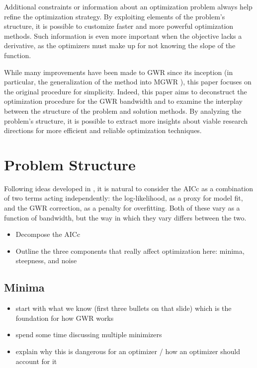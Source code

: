 \documentclass[letterpaper,12pt,twocolumn]{article}
\begin{document}
Additional constraints or information about an optimization problem always help refine the optimization strategy. By exploiting elements of the problem's structure, it is possible to customize faster and more powerful optimization methods. Such information is even more important when the objective lacks a derivative, as the optimizers must make up for not knowing the slope of the function.

While many improvements have been made to GWR since its inception (in particular, the generalization of the method into MGWR \cite{Oshan2019}), this paper focuses on the original procedure for simplicity. Indeed, this paper aims to deconstruct the optimization procedure for the GWR bandwidth and to examine the interplay between the structure of the problem and solution methods. By analyzing the problem's structure, it is possible to extract more insights about viable research directions for more efficient and reliable optimization techniques.

\section{Problem Structure}
\label{sec:problem}
Following ideas developed in \cite{Hoffman2021}, it is natural to consider the AICc as a combination of two terms acting independently: the log-likelihood, as a proxy for model fit, and the GWR correction, as a penalty for overfitting. Both of these vary as a function of bandwidth, but the way in which they vary differs between the two.

\begin{itemize}
    \item Decompose the AICc
    \item Outline the three components that really affect optimization here: minima, steepness, and noise
\end{itemize}

\subsection{Minima}
\begin{itemize}
    \item start with what we know (first three bullets on that slide) which is the foundation for how GWR works
    \item spend some time discussing multiple minimizers
    \item explain why this is dangerous for an optimizer / how an optimizer should account for it
\end{itemize}
\end{document}
